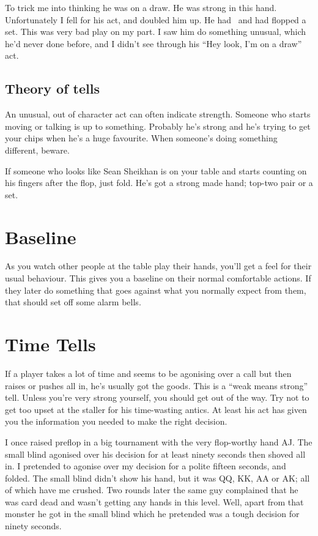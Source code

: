 To trick me into thinking he was on a draw. He was strong in
this hand. Unfortunately I fell for his act, and doubled him up.
He had \ninec\nineh\, and had flopped a set. This
was very bad play on my part. I saw him do something unusual, which
he'd never done before, and I didn't see through his
``Hey look, I'm on a draw'' act.

\subsection{Theory of tells}

An unusual, out of character act can often indicate
strength. Someone who starts moving or talking is up to something.
Probably he's strong and he's trying to get your chips when he's
a huge favourite. When someone's doing something different, beware.

If someone who looks like Sean Sheikhan is on your table and starts
counting on his fingers after the flop, just fold. He's
got a strong made hand; top-two pair or a set.

\section{Baseline}

As you watch other people at the table play their hands, you'll get a
feel for their usual behaviour. This gives you a baseline on their
normal comfortable actions. If they later do something that goes
against what you normally expect from them, that should set off some
alarm bells.

\section{Time Tells}

If a player takes a lot of time and seems to be agonising over a call
but then raises or pushes all in, he's usually got the goods.
This is a ``weak means strong'' tell.
Unless you're very strong yourself, you should get out
of the way. Try not to get too upset at the staller for
his time-wasting antics. At least his act has given you the
information you needed to make the right decision.

I once raised preflop in a big tournament with the very flop-worthy hand
AJ. The small blind agonised over his decision for at least ninety
seconds then shoved all in. I pretended to agonise over my decision
for a polite fifteen seconds, and folded. The small blind didn't show
his hand, but it was QQ, KK, AA or AK; all of which have me crushed.
Two rounds later the same
guy complained that he was card dead and wasn't getting any hands
in this level. Well, apart from that monster he got in the small blind
which he pretended was a tough decision for ninety seconds.

